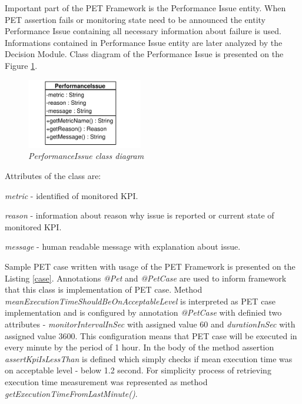 \documentclass[12pt,a4paper]{article}
\let\tempone\itemize
\let\temptwo\enditemize
\renewenvironment{itemize}{\tempone\addtolength{\itemsep}{-0.4\baselineskip}}{\temptwo}
\begin{document}
Important part of the PET Framework is the Performance Issue entity. When PET assertion fails or monitoring state need to be announced the entity Performance Issue containing all necessary information about failure is used. Informations contained in Performance Issue entity are later analyzed by the Decision Module. Class diagram of the Performance Issue is presented on the Figure \ref{issue}.

\begin{figure}[!htb]
\centering
\includegraphics[width=0.45\textwidth]{PerformanceIssueClassDiagram}
\caption{\textit{PerformanceIssue class diagram}} \label{issue}
\end{figure}
 
Attributes of the class are: 
\begin{itemize}
\item \textit{metric} - identified of monitored KPI.
\item \textit{reason} - information about reason why issue is reported or current state of monitored KPI.
\item \textit{message} - human readable message with explanation about issue.
\end{itemize}

Sample PET case written with usage of the PET Framework is presented on the Listing \ref{case}. Annotations \textit{@Pet} and \textit{@PetCase} are used to inform framework that this class is implementation of PET case. Method  \textit{meanExecutionTimeShouldBeOnAcceptableLevel} is interpreted as PET case implementation and is configured by annotation \textit{@PetCase} with definied two attributes - \textit{monitorIntervalInSec} with assigned value 60 and \textit{durationInSec} with assigned value 3600. This configuration means that PET case will be executed in every minute by the period of 1 hour. In the body of the method assertion \textit{assertKpiIsLessThan} is defined which simply checks if mean execution time was on acceptable level - below 1.2 second. For simplicity process of retrieving execution time measurement was represented as method  \textit{getExecutionTimeFromLastMinute()}.  
\end{document}
